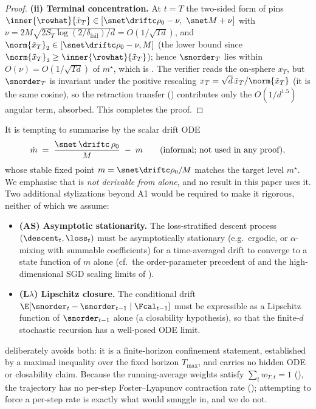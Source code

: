 \begin{proof}
\smallskip\noindent\textbf{(ii) Terminal concentration.} At $t=T$ the
two-sided form of  pins
$\inner{\rowhat}{\tilde x_T}\in[\snet\driftc\rho_0-\nu,\ \snet M+\nu]$ with
$\nu=2M\sqrt{2S_T\log(2/\delta_{\mathrm{fail}})/d}=O(1/\sqrt{Td})$, and
$\norm{\tilde x_T}_2\in[\snet\driftc\rho_0-\nu,M]$ (the lower bound since
$\norm{\tilde x_T}_2\ge\inner{\rowhat}{\tilde x_T}$); hence $\snorder_T$ lies
within $O(\nu)=O(1/\sqrt{Td})$ of $m^\star$, which is
. The verifier reads the on-sphere $x_T$,
but $\snorder_T$ is invariant under the positive rescaling
$x_T=\sqrt d\,\tilde x_T/\norm{\tilde x_T}$ (it is the same cosine), so the
retraction transfer () contributes only the
$O(1/d^{1.5})$ angular term, absorbed. This completes the proof.
\end{proof}

\begin{remark}
\label{rem:R3prime_ode}
It is tempting to summarise  by the scalar drift ODE
\begin{align}\label{eq:R3prime_ode}
   \dot m \;=\; \frac{\snet\,\driftc\,\rho_0}{M} \;-\; m
   \qquad\text{(informal; not used in any proof)},
\end{align}
whose stable fixed point $m=\snet\driftc\rho_0/M$ matches the target level
$m^\star$. We emphasise that  is \emph{not derivable
from  alone}, and no result in this paper uses it. Two
additional stylizations beyond A1 would be required to make it rigorous,
neither of which we assume:
\begin{itemize}[leftmargin=2em,itemsep=0.2em]
\item \textbf{(AS) Asymptotic stationarity.} The loss-stratified descent
       process $(\descent_t,\loss_t)$ must be asymptotically stationary
       (e.g.\ ergodic, or $\alpha$-mixing with summable coefficients) for
       a time-averaged drift to converge to a state function of $m$ alone
       (cf.\ the order-parameter precedent of \cite{saad1995online} and
       the high-dimensional SGD scaling limits of
       \cite{benarous2022highdim}).
\item \textbf{(L$\lambda$) Lipschitz closure.} The conditional drift
       $\E[\snorder_t-\snorder_{t-1}\mid\Fcal_{t-1}]$ must be expressible
       as a Lipschitz function of $\snorder_{t-1}$ alone (a closability
       hypothesis), so that the finite-$d$ stochastic recursion has a
       well-posed ODE limit.
\end{itemize}
 deliberately avoids both: it is a finite-horizon
confinement statement, established by a maximal inequality over the
fixed horizon $T_{\max}$, and carries no hidden ODE or closability claim.
Because the running-average weights satisfy $\sum_t w_{T,t}=1$
(), the trajectory has no per-step
Foster--Lyapunov contraction rate (); attempting to
force a per-step rate is exactly what  would smuggle
in, and we do not.
\end{remark}
